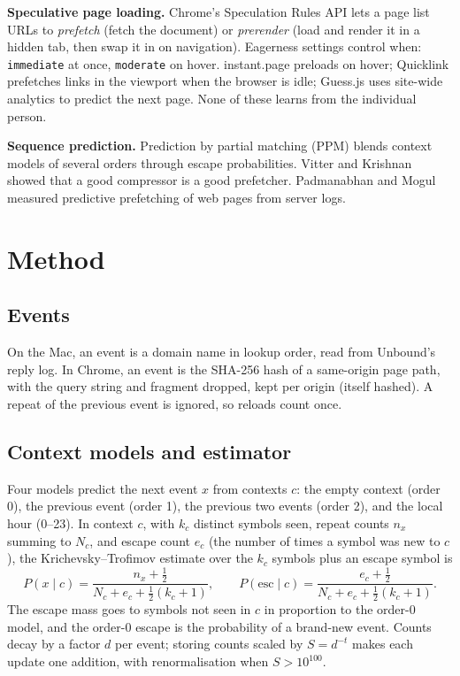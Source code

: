 \documentclass[11pt]{article}
\begin{document}
\textbf{Speculative page loading.} Chrome's Speculation Rules API lets a page list URLs to \emph{prefetch} (fetch the document) or \emph{prerender} (load and render it in a hidden tab, then swap it in on navigation). Eagerness settings control when: \texttt{immediate} at once, \texttt{moderate} on hover. instant.page \cite{instantpage} preloads on hover; Quicklink \cite{quicklink} prefetches links in the viewport when the browser is idle; Guess.js \cite{guessjs} uses site-wide analytics to predict the next page. None of these learns from the individual person.

\textbf{Sequence prediction.} Prediction by partial matching (PPM) \cite{cleary1984,moffat1990} blends context models of several orders through escape probabilities. Vitter and Krishnan \cite{vitter1996} showed that a good compressor is a good prefetcher. Padmanabhan and Mogul \cite{padmanabhan1996} measured predictive prefetching of web pages from server logs.

\section{Method}
\subsection{Events}
On the Mac, an event is a domain name in lookup order, read from Unbound's reply log. In Chrome, an event is the SHA-256 hash of a same-origin page path, with the query string and fragment dropped, kept per origin (itself hashed). A repeat of the previous event is ignored, so reloads count once.

\subsection{Context models and estimator}
Four models predict the next event $x$ from contexts $c$: the empty context (order 0), the previous event (order 1), the previous two events (order 2), and the local hour (0--23). In context $c$, with $k_c$ distinct symbols seen, repeat counts $n_x$ summing to $N_c$, and escape count $e_c$ (the number of times a symbol was new to $c$), the Krichevsky--Trofimov estimate over the $k_c$ symbols plus an escape symbol is
\[
P(x\mid c) = \frac{n_x + \tfrac12}{N_c + e_c + \tfrac12 (k_c+1)}, \qquad
P(\mathrm{esc}\mid c) = \frac{e_c + \tfrac12}{N_c + e_c + \tfrac12 (k_c+1)} .
\]
The escape mass goes to symbols not seen in $c$ in proportion to the order-0 model, and the order-0 escape is the probability of a brand-new event. Counts decay by a factor $d$ per event; storing counts scaled by $S=d^{-t}$ makes each update one addition, with renormalisation when $S>10^{100}$.
\end{document}
